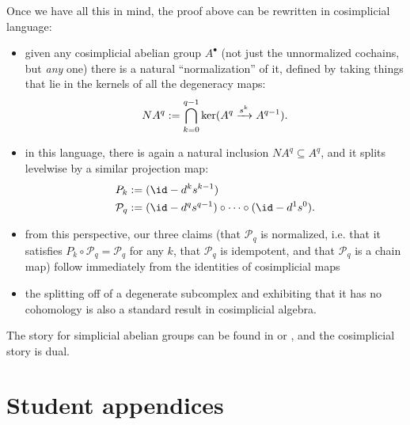 \documentclass[11pt]{book}
\begin{document}
\begin{remark}
Once we have all this in mind, the proof above can be rewritten in cosimplicial language:
\begin{itemize}
    \item given any cosimplicial abelian group $A^\bullet$ (not just the unnormalized cochains, but \emph{any} one) there is a natural ``normalization'' of it, defined by taking things that lie in the kernels of all the degeneracy maps:
    \begin{align*}
        NA^q := \bigcap_{k=0}^{q-1} \ker(A^q \xrightarrow{s^k} A^{q-1}).
    \end{align*}
    \item in this language, there is again a natural inclusion $NA^q \subseteq A^q$, and it splits levelwise by a similar projection map:
    \begin{align*}
        P_k &:= (\id - d^k s^{k-1}) \\
        \mathcal{P}_q &:= (\id - d^q s^{q-1}) \circ \cdots \circ (\id - d^1 s^0).
    \end{align*}
    \item from this perspective, our three claims (that $\mathcal{P}_q$ is normalized, i.e. that it satisfies $P_k\circ \mathcal{P}_q = \mathcal{P}_q$ for any $k$, that $\mathcal{P}_q$ is idempotent, and that $\mathcal{P}_q$ is a chain map) follow immediately from the identities of cosimplicial maps
    \item the splitting off of a degenerate subcomplex and exhibiting that it has no cohomology is also a standard result in cosimplicial algebra. 
\end{itemize}
The story for simplicial abelian groups can be found in \cite[VIII.6]{Maclane-homology} or \cite[III.2]{GoerssJardine}, and the cosimplicial story is dual.
\end{remark}



\chapter{Student appendices}
\minitoc




%
%





\end{document}
